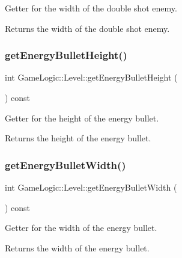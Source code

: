 Getter for the width of the double shot enemy. \begin{DoxyReturn}{Returns}
the width of the double shot enemy. 
\end{DoxyReturn}
\mbox{\label{classGameLogic_1_1Level_aa0b405c02ad398d415b2f378825d2c5b}} 
\subsubsection{\texorpdfstring{get\+Energy\+Bullet\+Height()}{getEnergyBulletHeight()}}
{\footnotesize\ttfamily int Game\+Logic\+::\+Level\+::get\+Energy\+Bullet\+Height (\begin{DoxyParamCaption}{ }\end{DoxyParamCaption}) const}

Getter for the height of the energy bullet. \begin{DoxyReturn}{Returns}
the height of the energy bullet. 
\end{DoxyReturn}
\mbox{\label{classGameLogic_1_1Level_aba38362ae3b9b72fdb883dcf42965f78}} 
\subsubsection{\texorpdfstring{get\+Energy\+Bullet\+Width()}{getEnergyBulletWidth()}}
{\footnotesize\ttfamily int Game\+Logic\+::\+Level\+::get\+Energy\+Bullet\+Width (\begin{DoxyParamCaption}{ }\end{DoxyParamCaption}) const}

Getter for the width of the energy bullet. \begin{DoxyReturn}{Returns}
the width of the energy bullet. 
\end{DoxyReturn}
\mbox{\label{classGameLogic_1_1Level_afbe96c6615ae2df79dd3ce90fcedf83a}} 
